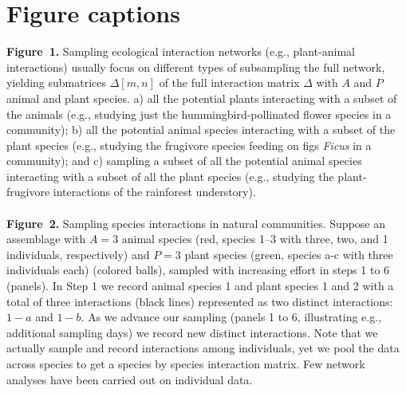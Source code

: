 \documentclass[12pt]{article}
\begin{document}
\section*{Figure captions}
\noindent \textbf{Figure~1.} Sampling ecological interaction networks (e.g., plant-animal interactions) usually focus on different types of subsampling the full network, yielding submatrices $\Delta[m,n]$ of the full interaction matrix $\Delta$ with $A$ and $P$ animal and plant species. a) all the potential plants interacting with a subset of the animals (e.g., studying just the hummingbird-pollinated flower species in a community); b) all the potential animal species interacting with a subset of the plant species (e.g., studying the frugivore species feeding on figs \emph{Ficus} in a community); and c) sampling a subset of all the potential animal species interacting with a subset of all the plant species (e.g., studying the plant-frugivore interactions of the rainforest understory). \\\\
\noindent \textbf{Figure~2.} Sampling species interactions in natural communities. Suppose an assemblage with $A= 3$ animal species (red, species 1--3 with three, two, and 1 individuals, respectively) and $P= 3$ plant species (green, species a-c with three individuals each) (colored balls), sampled with increasing effort in steps 1 to 6 (panels). In Step 1 we record animal species 1 and plant species 1 and 2 with a total of three interactions (black lines) represented as two distinct interactions: $1-a$ and $1-b$. As we advance our sampling (panels 1 to 6, illustrating e.g., additional sampling days) we record new distinct interactions. Note that we actually sample and record interactions among individuals, yet we pool the data across species to get a species by species interaction matrix. Few network analyses have been carried out on individual data\citep{Dupont:2014ex}. \\
\newpage
\end{document}
